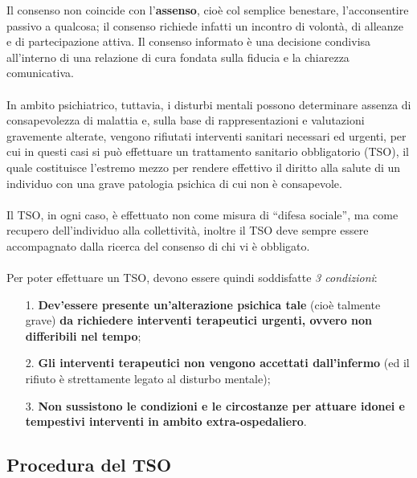 Il consenso non coincide con l'\textbf{assenso}, cioè col semplice
benestare, l'acconsentire passivo a qualcosa; il consenso richiede
infatti un incontro di volontà, di alleanze e di partecipazione attiva.
Il consenso informato è una decisione condivisa all'interno di una
relazione di cura fondata sulla fiducia e la chiarezza comunicativa.
\\\\
In ambito psichiatrico, tuttavia, i disturbi mentali possono determinare
assenza di consapevolezza di malattia e, sulla base di rappresentazioni
e valutazioni gravemente alterate, vengono rifiutati interventi sanitari
necessari ed urgenti, per cui in questi casi si può effettuare un
trattamento sanitario obbligatorio (TSO), il quale costituisce l'estremo
mezzo per rendere effettivo il diritto alla salute di un individuo con
una grave patologia psichica di cui non è consapevole.
\\\\
Il TSO, in ogni caso, è effettuato non come misura di ``difesa
sociale'', ma come recupero dell'individuo alla collettività, inoltre il
TSO deve sempre essere accompagnato dalla ricerca del consenso di chi vi
è obbligato.
\\\\
Per poter effettuare un TSO, devono essere quindi soddisfatte \emph{3
condizioni}:

\begin{itemize}
\item[1.]
  \textbf{Dev'essere presente un'alterazione psichica tale} (cioè
  talmente grave) \textbf{da richiedere interventi terapeutici urgenti,
  ovvero non differibili nel tempo};
\item[2.]
  \textbf{Gli interventi terapeutici non vengono accettati dall'infermo}
  (ed il rifiuto è strettamente legato al disturbo mentale);
\item[3.]
  \textbf{Non sussistono le condizioni e le circostanze per attuare
  idonei e tempestivi interventi in ambito extra-ospedaliero}.
\end{itemize}

\subsection{Procedura del TSO}

